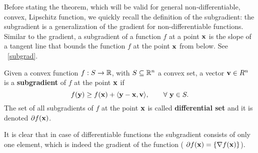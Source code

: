 \documentclass{article}
\begin{document}
Before stating the theorem, which will be valid for general non-differentiable, convex, Lipschitz function, we quickly recall the definition of the subgradient: the subgradient is a generalization of the gradient for non-differentiable functions. Similar to the gradient, a subgradient of a function $f$ at a point ${\bf x}$ is the slope of a tangent line that bounds the function $f$ at the point ${\bf x}$ from below. See \figurename \ \ref{subgrad}. \\
\begin{defn}\label{subgraddefn}
Given a convex function $f:S\to\mathbb{R}$, with $S \subseteq \mathbb{R}^n$ a convex set, a vector ${\bf v} \in R^n$ is a {\bf subgradient} of $f$ at the point ${\bf x}$ if
$$ f({\bf y}) \geq f({\bf x}) + \langle {\bf y} - {\bf x}, {\bf v} \rangle, \qquad \forall \ {\bf y} \in S.$$
The set of all subgradients of $f$ at the point ${\bf x}$ is called {\bf differential set} and it is denoted $\partial f ({\bf x})$.
\end{defn}
It is clear that in case of differentiable functions the subgradient consists of only one element, which is indeed the gradient of the function ( $\partial f ({\bf x}) = \{ \nabla f({\bf x})\} $).\\
\end{document}

